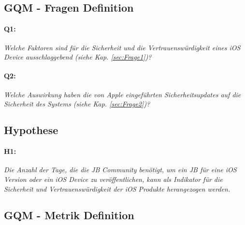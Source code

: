 \subsection{GQM - Fragen Definition}
\label{sec:GQMFragen}

\paragraph{Q1:} \textit{\glqq Welche Faktoren sind für die Sicherheit und die Vertrauenswürdigkeit eines iOS Device ausschlaggebend (siehe Kap. \ref{sec:Frage1})?\grqq{}}
                    
 \paragraph{Q2:} \textit{\glqq Welche Auswirkung haben die von Apple eingeführten Sicherheitsupdates auf die Sicherheit des Systems (siehe Kap. \ref{sec:Frage2})?\grqq{}}
        
\subsection{Hypothese}
\label{sec:GQMHypothese}
\paragraph{H1:} \textit{\glqq Die Anzahl der Tage, die die JB Community benötigt, um ein JB für eine iOS Version oder ein iOS Device zu veröffentlichen, kann als Indikator für die Sicherheit und Vertrauenswürdigkeit der iOS Produkte herangezogen werden.\grqq{}}

\subsection{GQM - Metrik Definition}
\label{sec:GQMMetrik}

